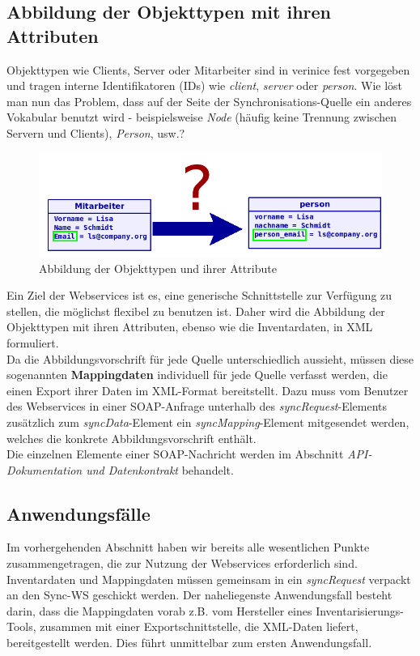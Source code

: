 \documentclass[a4paper,10pt]{book}
\begin{document}
\subsection{Abbildung der Objekttypen mit ihren Attributen}
Objekttypen wie Clients, Server oder Mitarbeiter sind in verinice fest vorgegeben und tragen interne
Identifikatoren (IDs) wie \textit{client}, \textit{server} oder \textit{person}. Wie löst man nun das Problem,
dass auf der Seite der Synchronisations-Quelle ein anderes Vokabular benutzt wird - beispielsweise \textit{Node}
(häufig keine Trennung zwischen Servern und Clients), \textit{Person}, usw.?
\newline
\begin{figure}[htb!]
  \centering
  \includegraphics[scale=.48]{Screenshot/Mapping_Attributtypen.png}
  \caption{\label{Abbildung der Objekttypen und ihrer Attribute} Abbildung der Objekttypen und ihrer Attribute}
\end{figure}
\newline
Ein Ziel der Webservices ist es, eine generische Schnittstelle zur Verfügung zu stellen, die möglichst
flexibel zu benutzen ist. Daher wird die Abbildung der Objekttypen mit ihren Attributen, ebenso
wie die Inventardaten, in XML formuliert.
\newline\\
Da die Abbildungsvorschrift für jede Quelle unterschiedlich aussieht, müssen diese sogenannten
\textbf{Mappingdaten} individuell für jede Quelle verfasst werden, die einen Export ihrer Daten im XML-Format
bereitstellt. Dazu muss vom Benutzer des Webservices in einer SOAP-Anfrage unterhalb des \textit{syncRequest}-Elements zusätzlich
zum \textit{syncData}-Element ein \textit{syncMapping}-Element mitgesendet werden, welches die konkrete Abbildungsvorschrift enthält.
\newline\\
Die einzelnen Elemente einer SOAP-Nachricht werden im Abschnitt \textit{API-Dokumentation und Datenkontrakt} behandelt.

\subsection{Anwendungsfälle}
Im vorhergehenden Abschnitt haben wir bereits alle wesentlichen Punkte zusammengetragen, die zur Nutzung der
Webservices erforderlich sind. Inventardaten und Mappingdaten müssen gemeinsam in ein \textit{syncRequest}
verpackt an den Sync-WS geschickt werden. Der naheliegenste Anwendungsfall besteht darin, dass die
Mappingdaten vorab z.B. vom Hersteller eines Inventarisierungs-Tools, zusammen mit einer Exportschnittstelle, die
XML-Daten liefert, bereitgestellt werden. Dies führt unmittelbar zum ersten Anwendungsfall.
\end{document}
